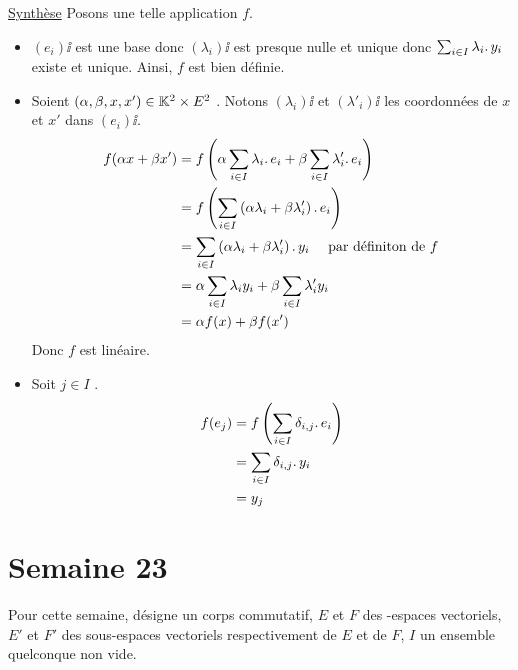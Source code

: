 \documentclass{article}
\renewenvironment{question_kholle}[2][ ]
{
	\subsection{\texorpdfstring{#2}{}}
	\notblank{#1}
	{
		\noindent #1
		\bigbreak
	}
	{}
	\begin{proof}
}
{
	\end{proof}
}
\begin{document}
\begin{question_kholle}
	\noindent \underline{Synthèse} Posons une telle application $f$. \\
	\begin{itemize}
		\item $(e_i)\ii$ est une base donc $(\lambda_i)\ii$ est presque nulle et unique donc $\sum_{i \in I} \lambda_i \ldotp y_i$ existe et unique.
		      Ainsi, $f$ est bien définie.
		\item Soient $(\alpha, \beta, x, x') \in \mathbb K^2 \times E^2$ \fqs. Notons $(\lambda_i)\ii$ et $(\lambda'_i)\ii$ les coordonnées de $x$ et $x'$ dans $(e_i)\ii$.
		      \begin{equation*}
			      \begin{aligned}
				      f( \alpha x + \beta x' )
				       & = f\left( \alpha \sum_{i \in I} \lambda_i \ldotp e_i + \beta \sum_{i \in I} \lambda'_i \ldotp e_i \right)               \\
				       & = f\left( \sum_{i \in I} \left( \alpha \lambda_i + \beta \lambda'_i \right) \ldotp e_i \right)                   \\
				       & = \sum_{i \in I} \left( \alpha \lambda_i + \beta \lambda'_i \right) \ldotp y_i \quad \text{ par définiton de } f \\
				       & = \alpha \sum_{i \in I} \lambda_i y_i + \beta \sum_{i \in I} \lambda'_i y_i                                             \\
				       & = \alpha f(x) + \beta f(x')
			      \end{aligned}
		      \end{equation*}
		      Donc $f$ est linéaire.
		\item Soit $j \in I$ \fq.
		      \begin{equation*}
			      \begin{aligned}
				      f(e_j)
				       & = f \left(\sum_{i \in I} \delta_{i,j} \ldotp e_i \right) \\
				       & = \sum_{i \in I} \delta_{i,j} \ldotp y_i                 \\
				       & = y_j
			      \end{aligned}
		      \end{equation*}
	\end{itemize}
\end{question_kholle}

\pagebreak\section{Semaine 23}

Pour cette semaine, \K désigne un corps commutatif, $E$ et $F$ des \K\!\!-espaces vectoriels, $E'$ et $F'$ des sous-espaces vectoriels respectivement de $E$ et de $F$, $I$ un ensemble quelconque non vide.
\end{document}
